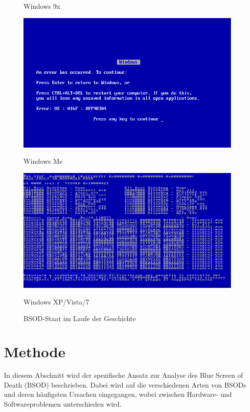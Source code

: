 \documentclass[paper=a4,fontsize=12pt,ngerman,parskip=half]{scrartcl}
\begin{document}
\begin{figure}[!ht]
\begin{minipage}[b]{0.4\textwidth}
    \caption{Windows 9x}
    \label{fig:image2}
  \end{minipage}
  \vfill
  \begin{minipage}[b]{0.4\textwidth}
    \centering
    \includegraphics[width=\textwidth]{graphics/Pic/Windows_9X_BSOD.png}
    \caption{Windows Me}
    \label{fig:image3}
  \end{minipage}
  \hfill
  \begin{minipage}[b]{0.4\textwidth}
    \centering
    \includegraphics[width=\textwidth]{graphics/Pic/Windows_NT_3.51_BSOD_ita.png}
    \caption{Windows XP/Vista/7}
    \label{fig:image4}
  \end{minipage}
  \caption{BSOD-Staat im Laufe der Geschichte}
  \label{fig:images}
\end{figure}


\pagebreak
\section{Methode}

In diesem Abschnitt wird der spezifische Ansatz zur Analyse des Blue Screen of Death (BSOD) beschrieben. Dabei wird auf die verschiedenen Arten von BSODs und deren häufigsten Ursachen eingegangen, wobei zwischen Hardware- und Softwareproblemen unterschieden wird.
\end{document}
